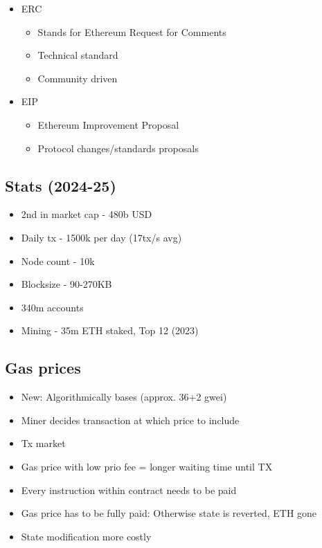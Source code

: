 \documentclass[../Main.tex]{subfiles}
\begin{document}
\begin{itemize}
    \item ERC
    \begin{itemize}
        \item Stands for Ethereum Request for Comments
        \item Technical standard
        \item Community driven
    \end{itemize}
    \item EIP
    \begin{itemize}
        \item Ethereum Improvement Proposal
        \item Protocol changes/standards proposals
    \end{itemize}
\end{itemize}

\subsection{Stats (2024-25)}
\begin{itemize}
    \item 2nd in market cap - 480b USD
    \item Daily tx - 1500k per day (17tx/s avg)
    \item Node count - 10k
    \item Blocksize - 90-270KB
    \item 340m accounts
    \item Mining - 35m ETH staked, Top 12 (2023)
\end{itemize}

\subsection{Gas prices}
\begin{itemize}
    \item New: Algorithmically bases (approx. 36+2 gwei)
    \item Miner decides transaction at which price to include
    \item Tx market
    \item Gas price with low prio fee = longer waiting time until TX
    \item Every instruction within contract needs to be paid
    \item Gas price has to be fully paid: Otherwise state is reverted, ETH gone
    \item State modification more costly
\end{itemize}
\end{document}
